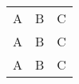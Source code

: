 \documentclass[10pt]{book}
\begin{document}
\begin{tabular}{ccc}
A & B & C \\
\cmidrule{2-3}
A & B & C \\
\cline{1-2}
A & B & C \\
\end{tabular}
\end{document}
